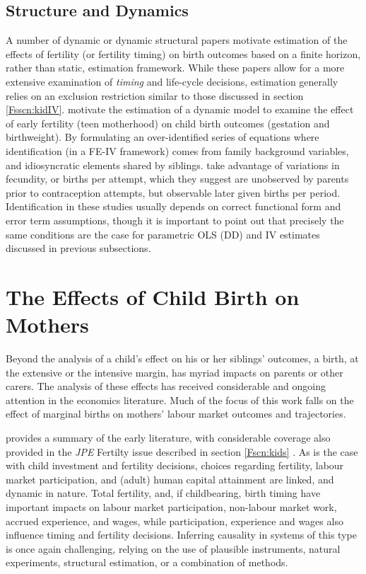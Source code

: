 \subsection{Structure and Dynamics}
A number of dynamic or dynamic structural papers motivate estimation of the
effects of fertility (or fertility timing) on birth outcomes based on a finite 
horizon, rather than static, estimation framework.  While these papers allow for 
a more extensive examination of \emph{timing} and life-cycle decisions, 
estimation generally relies on an exclusion restriction similar to those 
discussed in section \ref{Fsscn:kidIV}.  \citet{RosenzweigWolpin1995} motivate 
the estimation of a dynamic model to examine the effect of early fertility (teen 
motherhood) on child birth outcomes (gestation and birthweight).  By formulating 
an over-identified series of equations where identification (in a FE-IV framework) 
comes from family background variables, and idiosyncratic elements shared by 
siblings. \citet{RosenzweigSchultz1985} take advantage of variations in 
fecundity, or births per attempt, which they suggest are unobserved by parents 
prior to contraception attempts, but observable later given births per period.  
Identification in these studies usually depends on correct functional form and
error term assumptions, though it is important to point out that precisely the 
same conditions are the case for parametric OLS (DD) and IV estimates discussed
in previous subsections.

\section{The Effects of Child Birth on Mothers}
\label{Fscn:mothers}
Beyond the analysis of a child's effect on his or her siblings' outcomes, a
birth, at the extensive or the intensive margin, has myriad impacts on parents
or other carers.  The analysis of these effects has received considerable and 
ongoing attention in the economics literature.  Much of the focus of this work
falls on the effect of marginal births on mothers' labour market outcomes and
trajectories.

\citet{FleisherRhodes1979} provides a summary of the early literature, with 
considerable coverage also provided in the \emph{JPE} Fertilty issue described
in section \ref{Fscn:kids} \citep{Willis1973,Gronau1973}.  As is the case with
child investment and fertility decisions, choices regarding fertility, labour
market participation, and (adult) human capital attainment are linked, and 
dynamic in nature.  Total fertility, and, if childbearing, birth timing have
important impacts on labour market participation, non-labour market work, 
accrued experience, and wages, while participation, experience and wages also 
influence timing and fertility decisions. Inferring causality in systems of this 
type is once again challenging, relying on the use of plausible instruments, 
natural experiments, structural estimation, or a combination of methods.

